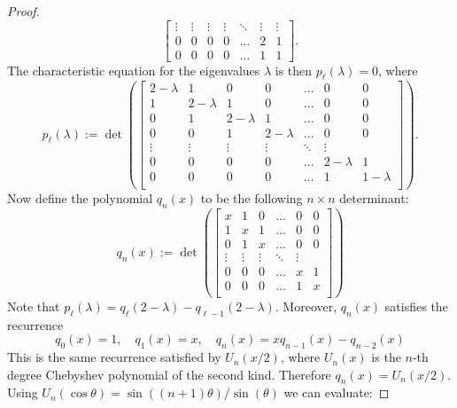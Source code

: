 \documentclass[11pt]{article}
\theoremstyle{definition}
\theoremstyle{remark}
\begin{document}
\begin{proof}
\begin{equation}
\begin{bmatrix}
    \vdots & \vdots & \vdots & \vdots & \ddots & \vdots & \vdots \\
    0 & 0 & 0 & 0 & \dots  & 2 & 1 \\
    0 & 0 & 0 & 0 & \dots  & 1 & 1
\end{bmatrix}.
\end{equation}
The characteristic equation for the eigenvalues $\lambda$ is then $p_\ell(\lambda) = 0$, where
\begin{equation} \label{eq:char_p}
p_\ell(\lambda) := 
\det \left(
\begin{bmatrix}
    2 - \lambda & 1 & 0 & 0 & \dots  & 0 & 0  \\
    1 & 2 - \lambda & 1 & 0 &\dots  & 0 & 0 \\
    0 & 1 & 2 - \lambda & 1 & \dots  & 0 & 0 \\
     0 & 0 & 1 & 2 - \lambda & \dots  & 0 & 0 \\
    \vdots & \vdots & \vdots & \vdots & \ddots & \vdots \\
    0 & 0 & 0 & 0 & \dots  & 2 - \lambda & 1 \\
    0 & 0 & 0 & 0 & \dots  & 1 & 1 - \lambda \\
\end{bmatrix} \right).
\end{equation}
Now define the polynomial $q_n(x)$ to be the following $n \times n$ determinant:
\begin{equation}
q_n(x) := 
\det \left(
\begin{bmatrix}
    x & 1 & 0 & \dots  & 0 & 0  \\
    1 & x & 1 &\dots  & 0 & 0 \\
    0 & 1 & x  & \dots  & 0 & 0 \\
    \vdots & \vdots & \vdots & \ddots & \vdots \\
    0 & 0 & 0 & \dots  & x & 1 \\
    0 & 0 & 0 & \dots  & 1 & x \\
\end{bmatrix} \right)
\end{equation}
Note that $p_\ell(\lambda) = q_\ell(2-\lambda) - q_{\ell-1}(2-\lambda)$. Moreover, $q_n(x)$ satisfies the recurrence
\begin{equation}
q_0(x) = 1, \quad q_1(x) = x, \quad q_n(x) = x q_{n-1}(x) - q_{n-2} (x)
\end{equation}
This is the same recurrence satisfied by $U_n(x/2)$, where $U_n(x)$ is the $n$-th degree Chebyshev polynomial of the second kind. Therefore $q_n(x) = U_n(x/2)$. Using $U_n(\cos\theta) = \sin((n+1)\theta)/\sin(\theta)$ we can evaluate:

\end{proof}
\end{document}
